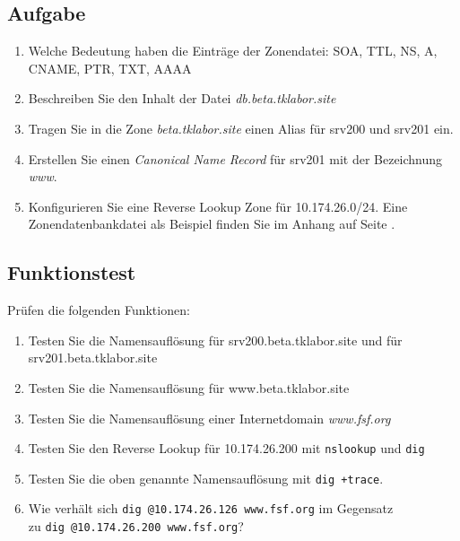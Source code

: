 \subsection{Aufgabe}
\begin{enumerate}
  \item Welche Bedeutung haben die Einträge der Zonendatei: SOA, TTL, NS, A,
  CNAME, PTR, TXT, AAAA
  \item Beschreiben Sie den Inhalt der Datei \textit{db.beta.tklabor.site}
  \item Tragen Sie in die Zone \textit{beta.tklabor.site} einen Alias
  für srv200 und srv201 ein.
  \item Erstellen Sie einen \textit{Canonical Name Record} für srv201 mit der
  Bezeichnung \textit{www}.
  \item Konfigurieren Sie eine Reverse Lookup Zone für 10.174.26.0/24. Eine
  Zonendatenbankdatei als Beispiel finden Sie im Anhang auf Seite
  \pageref{lst:reverse-zone-db}.
 \end{enumerate}

\subsection{Funktionstest}
Prüfen die folgenden Funktionen:
\begin{enumerate}
  \item Testen Sie die Namensauflösung für srv200.beta.tklabor.site und für
  srv201.beta.tklabor.site
  \item Testen Sie die Namensauflösung für www.beta.tklabor.site
  \item Testen Sie die Namensauflösung einer Internetdomain \textit{www.fsf.org}
  \item Testen Sie den Reverse Lookup für 10.174.26.200 mit \texttt{nslookup}
  und \texttt{dig}
  \item Testen Sie die oben genannte Namensauflösung mit \texttt{dig +trace}.
  \item Wie verhält sich \texttt{dig @10.174.26.126 www.fsf.org} im Gegensatz\\
  zu \texttt{dig @10.174.26.200 www.fsf.org}?
\end{enumerate}

